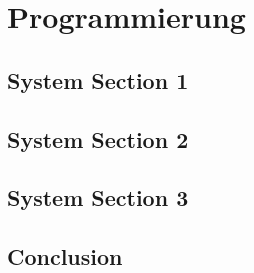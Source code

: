 %
\chapter{Programmierung}
\label{sec:programming}


\section{System Section 1}
\label{sec:programming:sec1}



\section{System Section 2}
\label{sec:programming:sec2}


\section{System Section 3}
\label{sec:programming:sec3}


\section{Conclusion}
\label{sec:programming:conclusion}
